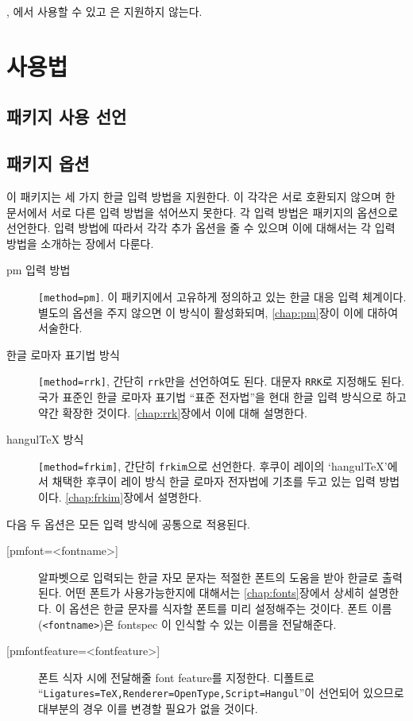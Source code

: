 \documentclass[a4paper,chapter]{oblivoir}
\newcommand\pkg[1]{%
	\textsf{#1}\index{#1}\index{패키지!#1}%
}
\begin{document}
, 에서 사용할 수 있고 
은 지원하지 않는다.

\section{사용법}

\subsection{패키지 사용 선언}

\begin{boxedverbatim}
\usepackage[<option>]{pmhanguljamo}
\end{boxedverbatim}

\subsection{패키지 옵션}

이 패키지는 세 가지 한글 입력 방법을 지원한다. 이 각각은 서로 호환되지 않으며
한 문서에서 서로 다른 입력 방법을 섞어쓰지 못한다. 각 입력 방법은 패키지의 옵션으로
선언한다. 입력 방법에 따라서 각각 추가 옵션을 줄 수 있으며 이에 대해서는 각 입력 방법을 소개하는 장에서 다룬다.
\begin{description}
\item [pm 입력 방법] \verb|[method=pm]|. 이 패키지에서 고유하게 정의하고 있는 한글 대응 입력 체계이다. 별도의 옵션을 주지 않으면 이 방식이 활성화되며, \ref{chap:pm}장이 이에 대하여 서술한다.

\item [한글 로마자 표기법 방식] \verb|[method=rrk]|, 간단히 \verb|rrk|만을 선언하여도 된다. 대문자 \verb|RRK|로 지정해도 된다.
국가 표준인 한글 로마자 표기법 ``표준 전자법''을 현대 한글 입력 방식으로 하고 약간 확장한 것이다. 
\ref{chap:rrk}장에서 이에 대해 설명한다.

\item [hangul\TeX{} 방식] \verb|[method=frkim]|, 간단히 \verb|frkim|으로 선언한다. 후쿠이 레이의 `hangul\TeX'에서 채택한 후쿠이 레이 방식 한글 로마자 전자법에 기초를 두고 있는 입력 방법이다. \ref{chap:frkim}장에서 설명한다.
\end{description}

다음 두 옵션은 모든 입력 방식에 공통으로 적용된다.

\begin{description}
\item [\ttfamily [pmfont=<fontname>{]}] 알파벳으로 입력되는 한글 자모 문자는 적절한 폰트의
도움을 받아 한글로 출력된다. 어떤 폰트가 사용가능한지에 대해서는 \ref{chap:fonts}장에서 상세히 설명한다. 이 옵션은 한글 문자를 식자할 폰트를 미리 설정해주는 것이다.
폰트 이름(\texttt{<fontname>})은 \pkg{fontspec}이 인식할 수 있는 이름을
전달해준다.

\item [\ttfamily [pmfontfeature=<fontfeature>{]}] 폰트 식자 시에 전달해줄 font feature를 지정한다. 디폴트로 ``\texttt{Ligatures=TeX,Renderer=OpenType,Script=Hangul}''이 선언되어 있으므로 대부분의 경우 이를 변경할 필요가 없을 것이다.
\end{description}
\end{document}

